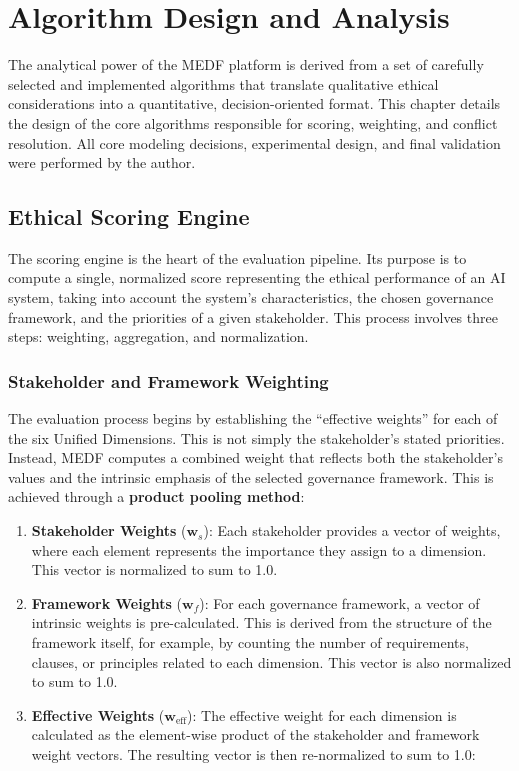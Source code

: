 \chapter{Algorithm Design and Analysis}
\label{ch:algorithms}

The analytical power of the MEDF platform is derived from a set of carefully selected and implemented algorithms that translate qualitative ethical considerations into a quantitative, decision-oriented format. This chapter details the design of the core algorithms responsible for scoring, weighting, and conflict resolution. All core modeling decisions, experimental design, and final validation were performed by the author.

\section{Ethical Scoring Engine}
\label{sec:scoring_engine}

The scoring engine is the heart of the evaluation pipeline. Its purpose is to compute a single, normalized score representing the ethical performance of an AI system, taking into account the system's characteristics, the chosen governance framework, and the priorities of a given stakeholder. This process involves three steps: weighting, aggregation, and normalization.

\subsection{Stakeholder and Framework Weighting}
\label{sec:weighting}

The evaluation process begins by establishing the \enquote{effective weights} for each of the six Unified Dimensions. This is not simply the stakeholder's stated priorities. Instead, MEDF computes a combined weight that reflects both the stakeholder's values and the intrinsic emphasis of the selected governance framework. This is achieved through a \textbf{product pooling method}:

\begin{enumerate}[leftmargin=2em]
  \item \textbf{Stakeholder Weights} ($\mathbf{w}_s$): Each stakeholder provides a vector of weights, where each element represents the importance they assign to a dimension. This vector is normalized to sum to 1.0.

  \item \textbf{Framework Weights} ($\mathbf{w}_f$): For each governance framework, a vector of intrinsic weights is pre-calculated. This is derived from the structure of the framework itself, for example, by counting the number of requirements, clauses, or principles related to each dimension. This vector is also normalized to sum to 1.0.

  \item \textbf{Effective Weights} ($\mathbf{w}_{\mathrm{eff}}$): The effective weight for each dimension is calculated as the element-wise product of the stakeholder and framework weight vectors. The resulting vector is then re-normalized to sum to 1.0:
\end{enumerate}

